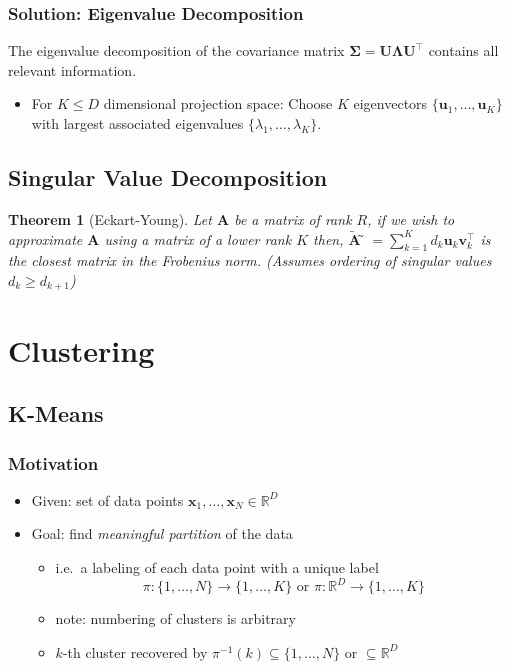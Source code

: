 \documentclass[conference,11pt]{IEEEtran}
\newtheorem*{thm}{Theorem}
\newcommand{\matr}[1]{\boldsymbol{\mathbf{#1}}}
\newcommand{\vect}[1]{\boldsymbol{\mathbf{#1}}}
\newcommand{\trns}[1]{#1^{\top}}
\newcommand{\R}{\mathbb{R}}
\begin{document}
\subsubsection{Solution: Eigenvalue Decomposition}
The eigenvalue decomposition of the covariance matrix
$\matr{\Sigma} = \matr{U}\matr{\Lambda}\trns{\matr{U}}$ contains
all relevant information.
\begin{itemize}
  \item For $K \leq D$ dimensional projection space: Choose $K$
    eigenvectors $\{\vect{u}_1, \ldots, \vect{u}_K\}$ with largest
    associated eigenvalues $\{\lambda_1, \ldots, \lambda_K\}$.
\end{itemize}

\subsection{Singular Value Decomposition}
\begin{thm}[Eckart-Young]
  Let $\matr{A}$ be a matrix of rank $R$, if we wish to
  approximate $\matr{A}$ using a matrix of a lower rank $K$
  then, $\tilde{\matr{A}} ̃= \sum_{k=1}^K d_k \vect{u}_k
  \trns{\vect{v}_k}$ is the closest matrix in the Frobenius norm.
  (Assumes ordering of singular values $d_k \geq d_{k+1}$)
\end{thm}

\section{Clustering}
\subsection{K-Means}
\subsubsection{Motivation}
\begin{itemize}
  \item Given: set of data points $\vect{x}_1, \ldots, \vect{x}_N \in \R^D$
  \item Goal: find \emph{meaningful partition} of the data
    \begin{itemize}
      \item i.e.\ a labeling of each data point with a unique label
        \[
          \pi: \{1,\ldots,N\} \to \{1,\ldots,K\} \text{ or }
          \pi: \R^D \to \{1,\ldots,K\}
        \]
      \item note: numbering of clusters is arbitrary
      \item $k$-th cluster recovered by $\pi^{-1}(k) \subseteq \{1,\ldots,N\}$
        or $\subseteq \R^D$
    \end{itemize}
\end{itemize}
\end{document}
